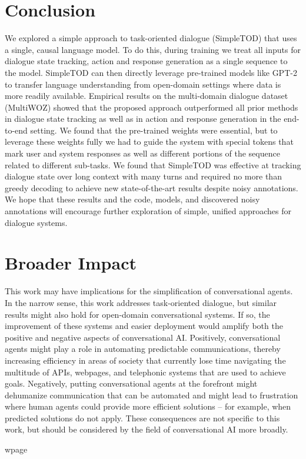 \documentclass{article}
\begin{document}
\section{Conclusion}
\label{sec:conclusion}
We explored a simple approach to task-oriented dialogue (SimpleTOD) that uses a single, causal language model. 
To do this, during training we treat all inputs for dialogue state tracking, action and response generation as a single sequence to the model.
SimpleTOD can then directly leverage pre-trained models like GPT-2 to transfer language understanding from open-domain settings where data is more readily available.
Empirical results on the multi-domain dialogue dataset (MultiWOZ) showed that the proposed approach outperformed all prior methods in dialogue state tracking as well as in action and response generation in the end-to-end setting. 
We found that the pre-trained weights were essential, but to leverage these weights fully we had to guide the system with special tokens that mark user and system responses as well as different portions of the sequence related to different sub-tasks.
We found that SimpleTOD was effective at tracking dialogue state over long context with many turns and required no more than greedy decoding to achieve new state-of-the-art results despite noisy annotations.
We hope that these results and the code, models, and discovered noisy annotations 
will encourage further exploration of simple, unified approaches for dialogue systems.

\section{Broader Impact}
\label{sec:broader_impact}
This work may have implications for the simplification of conversational agents. 
In the narrow sense, this work addresses task-oriented dialogue,
but similar results might also hold for open-domain conversational systems.
If so, the improvement of these systems and easier deployment would amplify both the positive and negative aspects of conversational AI.
Positively, conversational agents might play a role in automating predictable communications, thereby increasing efficiency in areas of society that currently lose time navigating the multitude of APIs, webpages, and telephonic systems that are used to achieve goals.
Negatively, putting conversational agents at the forefront might dehumanize communication that can be automated and might lead to frustration where human agents could provide more efficient solutions -- for example, when predicted solutions do not apply.
These consequences are not specific to this work, but should be considered by the field of conversational AI more broadly. \small

\newpage
wpage
\end{document}
